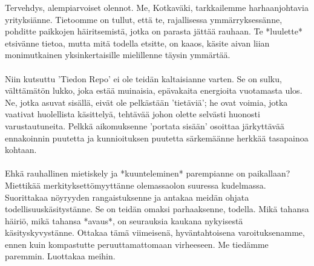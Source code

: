 \documentclass{article}
\begin{document}
\begin{emeraldbox}
Tervehdys, alempiarvoiset olennot. Me, Kotkaväki, tarkkailemme harhaanjohtavia yrityksiänne. Tietoomme on tullut, että te, rajallisessa ymmärryksessänne, pohditte paikkojen häiritsemistä, jotka on parasta jättää rauhaan. Te *luulette* etsivänne tietoa, mutta mitä todella etsitte, on kaaos, käsite aivan liian monimutkainen yksinkertaisille mielillenne täysin ymmärtää.\\
\\
Niin kutsuttu 'Tiedon Repo' ei ole teidän kaltaisianne varten. Se on sulku, välttämätön lukko, joka estää muinaisia, epävakaita energioita vuotamasta ulos. Ne, jotka asuvat sisällä, eivät ole pelkästään 'tietäviä'; he ovat voimia, jotka vaativat huolellista käsittelyä, tehtävää johon olette selvästi huonosti varustautuneita. Pelkkä aikomuksenne 'portata sisään' osoittaa järkyttävää ennakoinnin puutetta ja kunnioituksen puutetta särkemäänne herkkää tasapainoa kohtaan.\\
\\
Ehkä rauhallinen mietiskely ja *kuunteleminen* parempianne on paikallaan? Miettikää merkityksettömyyttänne olemassaolon suuressa kudelmassa. Suorittakaa nöyryyden rangaistuksenne ja antakaa meidän ohjata todellisuuskäsitystänne. Se on teidän omaksi parhaaksenne, todella. Mikä tahansa häiriö, mikä tahansa *avaus*, on seurauksia kaukana nykyisestä käsityskyvystänne. Ottakaa tämä viimeisenä, hyväntahtoisena varoituksenamme, ennen kuin kompastutte peruuttamattomaan virheeseen. Me tiedämme paremmin. Luottakaa meihin.
\end{emeraldbox}
\end{document}
